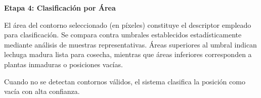 \textbf{Etapa 4: Clasificación por Área}

El área del contorno seleccionado (en píxeles) constituye el descriptor empleado para clasificación. Se compara contra umbrales establecidos estadísticamente mediante análisis de muestras representativas. Áreas superiores al umbral indican lechuga madura lista para cosecha, mientras que áreas inferiores corresponden a plantas inmaduras o posiciones vacías.

Cuando no se detectan contornos válidos, el sistema clasifica la posición como vacía con alta confianza.


